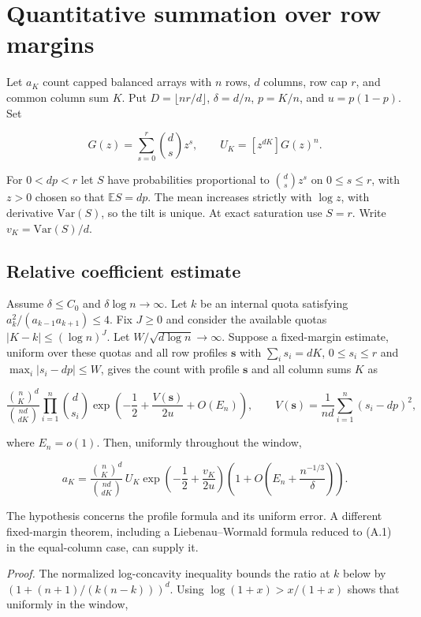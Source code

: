\section{Quantitative summation over row margins}\label{app:quantitative-margins}

Let $a_K$ count capped balanced arrays with $n$ rows, $d$ columns, row cap $r$, and common column sum $K$. Put $D=\lfloor nr/d\rfloor$, $\delta=d/n$, $p=K/n$, and $u=p(1-p)$. Set

\[
G(z)=\sum_{s=0}^r\binom ds z^s,\qquad U_K=[z^{dK}]G(z)^n.
\]

For $0<dp<r$ let $S$ have probabilities proportional to $\binom ds z^s$ on $0\le s\le r$, with $z>0$ chosen so that $\mathbb E S=dp$. The mean increases strictly with $\log z$, with derivative $\mathrm{Var}(S)$, so the tilt is unique. At exact saturation use $S=r$. Write $v_K=\mathrm{Var}(S)/d$.

\subsection{Relative coefficient estimate}

Assume $\delta\le C_0$ and $\delta\log n\to\infty$. Let $k$ be an internal quota satisfying $a_k^2/(a_{k-1}a_{k+1})\le4$. Fix $J\ge0$ and consider the available quotas $|K-k|\le(\log n)^J$. Let $W/\sqrt{d\log n}\to\infty$. Suppose a fixed-margin estimate, uniform over these quotas and all row profiles $\mathbf s$ with $\sum_i s_i=dK$, $0\le s_i\le r$ and $\max_i|s_i-dp|\le W$, gives the count with profile $\mathbf s$ and all column sums $K$ as

\[
\frac{\binom nK^d}{\binom{nd}{dK}}\prod_{i=1}^n\binom d{s_i}
 \exp\left(-\frac12+\frac{V(\mathbf s)}{2u}+O(E_n)\right),
\qquad
V(\mathbf s)=\frac{1}{nd}\sum_{i=1}^n(s_i-dp)^2,
\tag{A.1}
\]

where $E_n=o(1)$. Then, uniformly throughout the window,

\[
a_K=\frac{\binom nK^d}{\binom{nd}{dK}}\,U_K
 \exp\left(-\frac12+\frac{v_K}{2u}\right)
 \left(1+O\left(E_n+\frac{n^{-1/3}}{\delta}\right)\right).
\tag{A.2}
\]

The hypothesis concerns the profile formula and its uniform error. A different fixed-margin theorem, including a Liebenau--Wormald formula reduced to (A.1) in the equal-column case, can supply it.

\noindent\textit{Proof.} The normalized log-concavity inequality bounds the ratio at $k$ below by $(1+(n+1)/(k(n-k)))^d$. Using $\log(1+x)>x/(1+x)$ shows that uniformly in the window,

